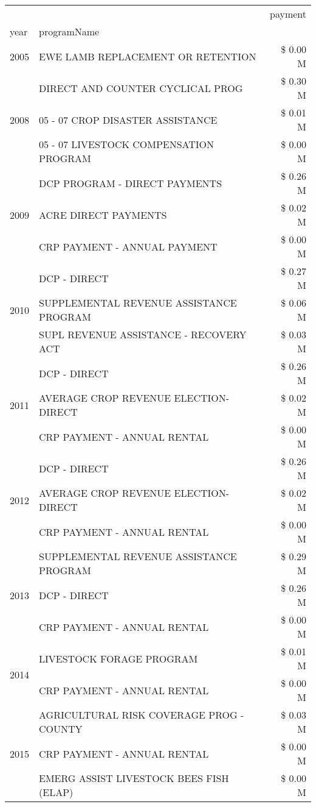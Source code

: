 \begin{tabular}{llr}
\toprule
 &  & payment \\
year & programName &  \\
\midrule
2005 & EWE LAMB REPLACEMENT OR RETENTION & \$ 0.00 M \\
\cline{1-3}
\multirow[t]{3}{*}{2008} & DIRECT AND COUNTER CYCLICAL PROG & \$ 0.30 M \\
 & 05 - 07 CROP DISASTER ASSISTANCE & \$ 0.01 M \\
 & 05 - 07 LIVESTOCK COMPENSATION PROGRAM & \$ 0.00 M \\
\cline{1-3}
\multirow[t]{3}{*}{2009} & DCP PROGRAM - DIRECT PAYMENTS & \$ 0.26 M \\
 & ACRE DIRECT PAYMENTS & \$ 0.02 M \\
 & CRP PAYMENT - ANNUAL PAYMENT & \$ 0.00 M \\
\cline{1-3}
\multirow[t]{3}{*}{2010} & DCP - DIRECT & \$ 0.27 M \\
 & SUPPLEMENTAL REVENUE ASSISTANCE PROGRAM & \$ 0.06 M \\
 & SUPL REVENUE ASSISTANCE - RECOVERY ACT & \$ 0.03 M \\
\cline{1-3}
\multirow[t]{3}{*}{2011} & DCP - DIRECT & \$ 0.26 M \\
 & AVERAGE CROP REVENUE ELECTION-DIRECT & \$ 0.02 M \\
 & CRP PAYMENT - ANNUAL RENTAL & \$ 0.00 M \\
\cline{1-3}
\multirow[t]{3}{*}{2012} & DCP - DIRECT & \$ 0.26 M \\
 & AVERAGE CROP REVENUE ELECTION-DIRECT & \$ 0.02 M \\
 & CRP PAYMENT - ANNUAL RENTAL & \$ 0.00 M \\
\cline{1-3}
\multirow[t]{3}{*}{2013} & SUPPLEMENTAL REVENUE ASSISTANCE PROGRAM & \$ 0.29 M \\
 & DCP - DIRECT & \$ 0.26 M \\
 & CRP PAYMENT - ANNUAL RENTAL & \$ 0.00 M \\
\cline{1-3}
\multirow[t]{2}{*}{2014} & LIVESTOCK FORAGE PROGRAM & \$ 0.01 M \\
 & CRP PAYMENT - ANNUAL RENTAL & \$ 0.00 M \\
\cline{1-3}
\multirow[t]{3}{*}{2015} & AGRICULTURAL RISK COVERAGE PROG - COUNTY & \$ 0.03 M \\
 & CRP PAYMENT - ANNUAL RENTAL & \$ 0.00 M \\
 & EMERG ASSIST LIVESTOCK BEES FISH (ELAP) & \$ 0.00 M \\
\cline{1-3}

\end{tabular}
